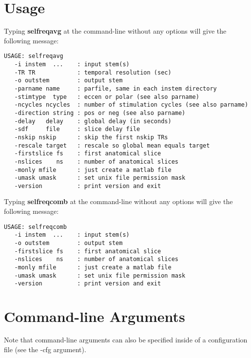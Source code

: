 \documentclass[10pt]{article}
\begin{document}
\section{Usage}

Typing {\bf selfreqavg} at the command-line without any options will
give the following message:\\

\begin{small}
\begin{verbatim}
USAGE: selfreqavg
   -i instem  ...    : input stem(s)
   -TR TR            : temporal resolution (sec)
   -o outstem        : output stem
   -parname name     : parfile, same in each instem directory
   -stimtype  type   : eccen or polar (see also parname)
   -ncycles ncycles  : number of stimulation cycles (see also parname)
   -direction string : pos or neg (see also parname)
   -delay   delay    : global delay (in seconds)
   -sdf     file     : slice delay file
   -nskip nskip      : skip the first nskip TRs
   -rescale target   : rescale so global mean equals target
   -firstslice fs    : first anatomical slice
   -nslices    ns    : number of anatomical slices
   -monly mfile      : just create a matlab file
   -umask umask      : set unix file permission mask
   -version          : print version and exit
\end{verbatim}
\end{small}

Typing {\bf selfreqcomb} at the command-line without any options will give the
following message:\\ 

\begin{small}
\begin{verbatim}
USAGE: selfreqcomb
   -i instem  ...    : input stem(s)
   -o outstem        : output stem
   -firstslice fs    : first anatomical slice
   -nslices    ns    : number of anatomical slices
   -monly mfile      : just create a matlab file
   -umask umask      : set unix file permission mask
   -version          : print version and exit
\end{verbatim}
\end{small}

\section{Command-line Arguments}

Note that command-line arguments can also be specified inside of a
configuration file (see the -cfg argument).
\end{document}
